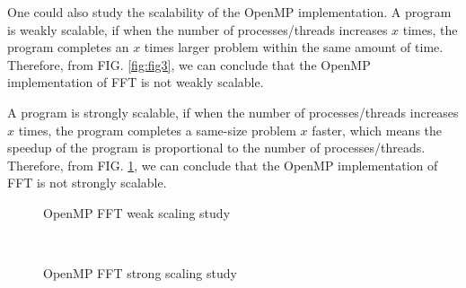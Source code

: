 \documentclass[amsmath,amssymb]{revtex4}
\begin{document}
\newpage
One could also study the scalability of the OpenMP implementation. A program is weakly scalable, if when the number of processes/threads increases $x$ times, the program completes an $x$ times larger problem within the same amount of time. Therefore, from FIG. \ref{fig:fig3}, we can conclude that the OpenMP implementation of FFT is not weakly scalable.

A program is strongly scalable, if when the number of processes/threads increases $x$ times, the program completes a same-size problem $x$ faster, which means the speedup of the program is proportional to the number of processes/threads. Therefore, from FIG. \ref{fig:fig4}, we can conclude that the OpenMP implementation of FFT is not strongly scalable.

\begin{figure}[h]
  \centering
  \begin{minipage}[b]{0.45\textwidth}

\caption{\label{fig:fig3}OpenMP FFT weak scaling study}
\end{minipage}
~
\begin{minipage}[b]{0.45\textwidth}
\caption{\label{fig:fig4}OpenMP FFT strong scaling study}
\end{minipage}
\end{figure}
\end{document}

